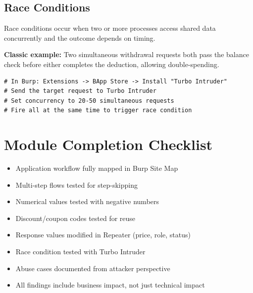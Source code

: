 \subsection{Race Conditions}
Race conditions occur when two or more processes access shared data concurrently and the outcome depends on timing.

\textbf{Classic example:} Two simultaneous withdrawal requests both pass the balance check before either completes the deduction, allowing double-spending.

\begin{lstlisting}[style=terminal, caption={Burp Turbo Intruder for race condition testing}]
# In Burp: Extensions -> BApp Store -> Install "Turbo Intruder"
# Send the target request to Turbo Intruder
# Set concurrency to 20-50 simultaneous requests
# Fire all at the same time to trigger race condition
\end{lstlisting}

\section{Module Completion Checklist}

\begin{tcolorbox}[findingstyle, title={Level 07 Burp Checklist}]
\begin{itemize}
  \item[\checkbox] Application workflow fully mapped in Burp Site Map
  \item[\checkbox] Multi-step flows tested for step-skipping
  \item[\checkbox] Numerical values tested with negative numbers
  \item[\checkbox] Discount/coupon codes tested for reuse
  \item[\checkbox] Response values modified in Repeater (price, role, status)
  \item[\checkbox] Race condition tested with Turbo Intruder
  \item[\checkbox] Abuse cases documented from attacker perspective
  \item[\checkbox] All findings include business impact, not just technical impact
\end{itemize}
\end{tcolorbox}
